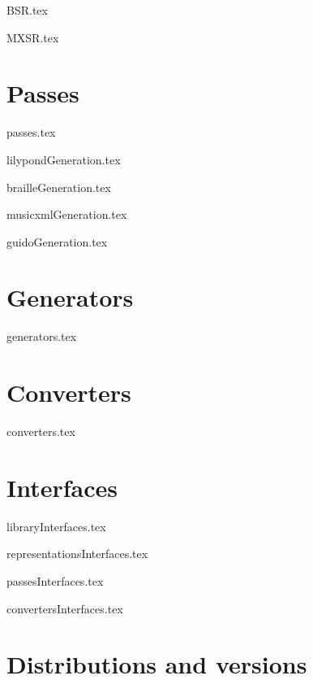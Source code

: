 \documentclass[11pt,a4paper]{report}
\begin{document}
{BSR.tex}

{MXSR.tex}


\part{Passes}

{passes.tex}

{lilypondGeneration.tex}

{brailleGeneration.tex}

{musicxmlGeneration.tex}

{guidoGeneration.tex}


\part{Generators}

{generators.tex}


\part{Converters}

{converters.tex}


\part{Interfaces}

{libraryInterfaces.tex}

{representationsInterfaces.tex}

{passesInterfaces.tex}

{convertersInterfaces.tex}


\part{Distributions and versions}
\end{document}
